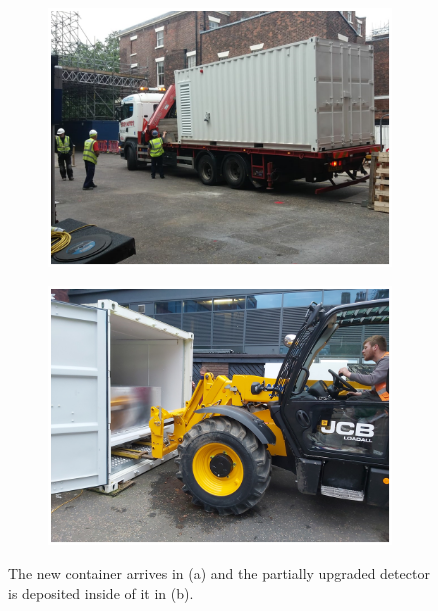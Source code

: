 \begin{figure}[!h]
\centering
\begin{subfigure}{.5\textwidth}
  \centering
  \includegraphics[width=\linewidth]{Chapter3/Figs/Raster/detCon037c_ContainerArrives.png}
  \captionsetup{width=.9\linewidth}
  \caption{}
  \label{subFig:detCon037c_ContainerArrives}
\end{subfigure}%
\begin{subfigure}{.5\textwidth}
  \centering
  \includegraphics[width=\linewidth]{Chapter3/Figs/Raster/detCon039b_PutIn2.png}
  \captionsetup{width=.9\linewidth}
  \caption{}
  \label{subFig:detCon039b_PutIn2}
\end{subfigure}
\caption{The new container arrives in (a) and the partially upgraded detector is deposited inside of it in (b).}
\label{fig:detCon_ContainerArrives_PutIn}
\end{figure}

